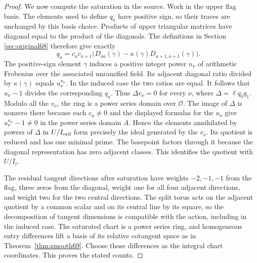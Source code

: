 \documentclass[a4paper,11pt]{article}
\theoremstyle{definition}
\theoremstyle{remark}
\numberwithin{equation}{section}
\newcommand{\OO}{\mathcal O}
\begin{document}
\begin{proof}
We now compute the saturation in the source. Work in the upper
flag basis. The elements used to define \(q_a\) have positive
sign, so their traces are unchanged by this basis choice.
Products of upper triangular matrices have diagonal equal to
the product of the diagonals. The definitions in Section
\ref{sec:original68} therefore give exactly
\[
       q_a=c_a c_{a+1}
              \big(D_{aa}(\gamma)-\kappa(\gamma)
                                  D_{a+1,a+1}(\gamma)\big).
\]
The positive-sign element \(\gamma\) induces a positive
integer power \(n_\nu\) of arithmetic Frobenius over the
associated unramified field. Its adjacent diagonal ratio
divided by \(\kappa(\gamma)\) equals \(u_\nu^{n_\nu}\).
In the induced case the two ratios are equal. It follows
that \(u_\nu-1\) divides the corresponding \(q_a\).
Thus \(\Delta v_\nu=0\) for every \(\nu\), where
\(\Delta=\ell q_0q_1\). Modulo all the \(v_\nu\), the ring
is a power series domain over \(\OO\). The image of
\(\Delta\) is nonzero there because each \(c_a\ne0\) and the
displayed formulas for the \(u_\nu\) give
\(u_\nu^{n_\nu}-1\ne0\) in the power series domain \(A\).
Hence the elements annihilated by powers of \(\Delta\) in
\(U/I_{\rm ord}\) form precisely the ideal generated by the
\(v_\nu\). Its quotient is reduced and has one minimal prime. The
basepoint factors through it because the diagonal representation
has zero adjacent classes. This identifies the quotient with \(U/I_t\).

The residual tangent directions after saturation have weights
\(-2,-1,-1\) from the flag, three zeros from the diagonal,
weight one for all four adjacent directions, and weight two
for the two central directions. The split torus acts on the
adjacent quotient by a common scalar and on its central line
by its square, so the decomposition of tangent dimensions is
compatible with the action, including in the induced case.
The saturated chart is a power series ring, and homogeneous
entry differences lift a basis of its relative cotangent space
as in Theorem~\ref{thm:smooth69}. Choose those differences as
the integral chart coordinates. This proves the stated counts.
\end{proof}
\end{document}
